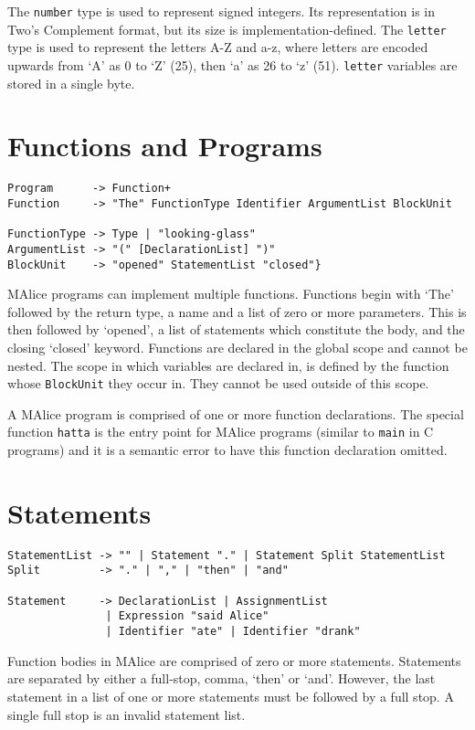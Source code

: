 \documentclass[a4wide, 11pt]{article}
\begin{document}
The \texttt{number} type is used to represent signed integers. Its representation is in Two's Complement format, but its size is implementation-defined. The \texttt{letter} type is used to represent the letters A-Z and a-z, where letters are encoded upwards from `A' as 0 to `Z' (25), then `a' as 26 to `z' (51). \texttt{letter} variables are stored in a single byte.

\section{Functions and Programs}

\begin{verbatim}
Program      -> Function+
Function     -> "The" FunctionType Identifier ArgumentList BlockUnit

FunctionType -> Type | "looking-glass"
ArgumentList -> "(" [DeclarationList] ")"
BlockUnit    -> "opened" StatementList "closed"}
\end{verbatim}

MAlice programs can implement multiple functions. Functions begin with `The' followed by the return type, a name and a list of zero or more parameters. This is then followed by `opened', a list of statements which constitute the body, and the closing `closed' keyword. Functions are declared in the global scope and cannot be nested. The scope in which variables are declared in, is defined by the function whose \texttt{BlockUnit} they occur in. They cannot be used outside of this scope.

A MAlice program is comprised of one or more function declarations. The special function \texttt{hatta} is the entry point for MAlice programs (similar to \texttt{main} in C programs) and it is a semantic error to have this function declaration omitted.

\section{Statements}

\begin{verbatim}
StatementList -> "" | Statement "." | Statement Split StatementList
Split         -> "." | "," | "then" | "and"
               
Statement     -> DeclarationList | AssignmentList
               | Expression "said Alice"
               | Identifier "ate" | Identifier "drank"
\end{verbatim}

Function bodies in MAlice are comprised of zero or more statements. Statements are separated by either a full-stop, comma, `then' or `and'. However, the last statement in a list of one or more statements must be followed by a full stop. A single full stop is an invalid statement list.
\end{document}
